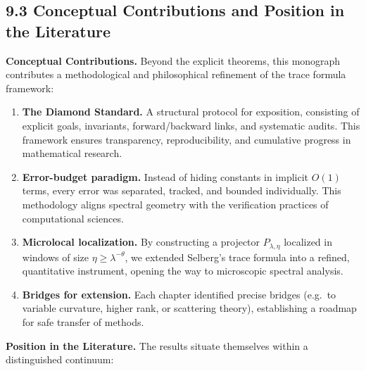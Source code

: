 

\subsection*{9.3 Conceptual Contributions and Position in the Literature}

\noindent\textbf{Conceptual Contributions.}
Beyond the explicit theorems, this monograph contributes a methodological
and philosophical refinement of the trace formula framework:

\begin{enumerate}
  \item \textbf{The Diamond Standard.}  
  A structural protocol for exposition, consisting of explicit goals,
  invariants, forward/backward links, and systematic audits.
  This framework ensures transparency, reproducibility,
  and cumulative progress in mathematical research.

  \item \textbf{Error-budget paradigm.}  
  Instead of hiding constants in implicit $O(1)$ terms,
  every error was separated, tracked, and bounded individually.
  This methodology aligns spectral geometry with the verification practices
  of computational sciences.

  \item \textbf{Microlocal localization.}  
  By constructing a projector $P_{\lambda,\eta}$ localized in windows
  of size $\eta \ge \lambda^{-\theta}$,
  we extended Selberg’s trace formula into a refined, quantitative instrument,
  opening the way to microscopic spectral analysis.

  \item \textbf{Bridges for extension.}  
  Each chapter identified precise bridges (e.g.\ to variable curvature,
  higher rank, or scattering theory),
  establishing a roadmap for safe transfer of methods.
\end{enumerate}

\medskip

\noindent\textbf{Position in the Literature.}
The results situate themselves within a distinguished continuum:

